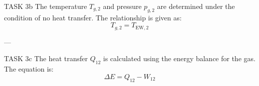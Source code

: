 TASK 3b  
The temperature \( T_{g,2} \) and pressure \( p_{g,2} \) are determined under the condition of no heat transfer.  
The relationship is given as:  
\[
T_{g,2} = T_{\text{EW},2}
\]

---

TASK 3c  
The heat transfer \( Q_{12} \) is calculated using the energy balance for the gas.  
The equation is:  
\[
\Delta E = Q_{12} - W_{12}
\]